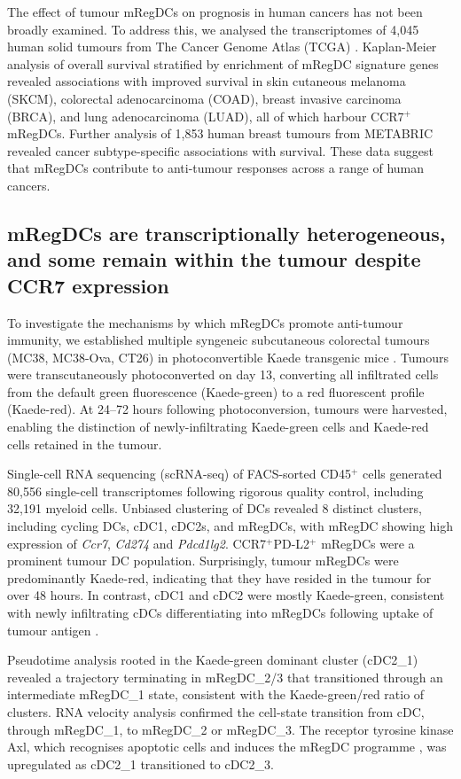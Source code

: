 \documentclass[11pt]{article}
\begin{document}
The effect of tumour mRegDCs on prognosis in human cancers has not been broadly examined. To address this, we analysed the transcriptomes of 4,045 human solid tumours from The Cancer Genome Atlas (TCGA) \citep{cancer2023}. Kaplan-Meier analysis of overall survival stratified by enrichment of mRegDC signature genes revealed associations with improved survival in skin cutaneous melanoma (SKCM), colorectal adenocarcinoma (COAD), breast invasive carcinoma (BRCA), and lung adenocarcinoma (LUAD), all of which harbour CCR7$^+$ mRegDCs. Further analysis of 1,853 human breast tumours from METABRIC \citep{curtis2012} revealed cancer subtype-specific associations with survival. These data suggest that mRegDCs contribute to anti-tumour responses across a range of human cancers.

\subsection{mRegDCs are transcriptionally heterogeneous, and some remain within the tumour despite CCR7 expression}

To investigate the mechanisms by which mRegDCs promote anti-tumour immunity, we established multiple syngeneic subcutaneous colorectal tumours (MC38, MC38-Ova, CT26) in photoconvertible Kaede transgenic mice \citep{tomura2008}. Tumours were transcutaneously photoconverted on day 13, converting all infiltrated cells from the default green fluorescence (Kaede-green) to a red fluorescent profile (Kaede-red). At 24--72 hours following photoconversion, tumours were harvested, enabling the distinction of newly-infiltrating Kaede-green cells and Kaede-red cells retained in the tumour.

Single-cell RNA sequencing (scRNA-seq) of FACS-sorted CD45$^+$ cells generated 80,556 single-cell transcriptomes following rigorous quality control, including 32,191 myeloid cells. Unbiased clustering of DCs revealed 8 distinct clusters, including cycling DCs, cDC1, cDC2s, and mRegDCs, with mRegDC showing high expression of \textit{Ccr7}, \textit{Cd274} and \textit{Pdcd1lg2}. CCR7$^+$PD-L2$^+$ mRegDCs were a prominent tumour DC population. Surprisingly, tumour mRegDCs were predominantly Kaede-red, indicating that they have resided in the tumour for over 48 hours. In contrast, cDC1 and cDC2 were mostly Kaede-green, consistent with newly infiltrating cDCs differentiating into mRegDCs following uptake of tumour antigen \citep{maier2020}.

Pseudotime analysis rooted in the Kaede-green dominant cluster (cDC2\_1) revealed a trajectory terminating in mRegDC\_2/3 that transitioned through an intermediate mRegDC\_1 state, consistent with the Kaede-green/red ratio of clusters. RNA velocity analysis confirmed the cell-state transition from cDC, through mRegDC\_1, to mRegDC\_2 or mRegDC\_3. The receptor tyrosine kinase Axl, which recognises apoptotic cells and induces the mRegDC programme \citep{maier2020}, was upregulated as cDC2\_1 transitioned to cDC2\_3.
\end{document}
